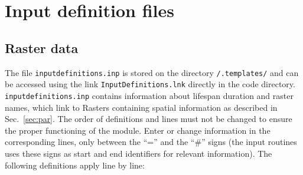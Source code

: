 \section{Input definition files}\label{sec:inp}
\subsection{Raster data}\label{sec:inpfile}

The file \texttt{input{\myUnderscore}definitions.inp} is stored on the directory \texttt{/.templates/} and can be accessed using the link \texttt{InputDefinitions.lnk} directly in the code directory. \texttt{input{\myUnderscore}definitions.inp} contains information about lifespan duration and raster names, which link to Rasters containing spatial information as described in Sec.~\ref{sec:par}. The order of definitions and lines must not be changed to ensure the proper functioning of the module. Enter or change information in the corresponding lines, only between the ``='' and the ``$\#$'' signs (the input routines uses these signs as start and end identifiers for relevant information). The following definitions apply line by line:\\


